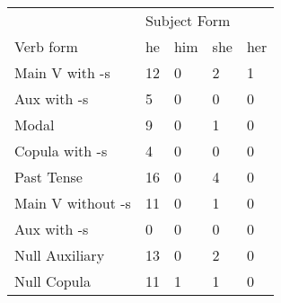 \begin{table}[]
\begin{minipage}{0.5\textwidth}
\end{minipage}
\begin{minipage}{0.5\textwidth}
    \centering
    \begin{tabular}{@{}lllll@{}}
        \toprule
            &\multicolumn{4}{l}{Subject Form}\\
            \cline{2-5}
        Verb form & he & him & she & her \\
        \midrule
        Main V with -s & 12 & 0 & 2 & 1 \\
        Aux with -s & 5 & 0 & 0 & 0 \\
        Modal & 9 & 0 & 1 & 0 \\
        Copula with -s & 4 & 0 & 0 & 0 \\
        Past Tense & 16 & 0 & 4 & 0 \\
        \hline
        Main V without -s & 11 & 0 & 1 & 0 \\
        Aux with -s & 0 & 0 & 0 & 0 \\
        Null Auxiliary & 13 & 0 & 2 & 0 \\
        Null Copula & 11 & 1 & 1 & 0 \\
        \bottomrule
    \end{tabular}
    \end{minipage}
\end{table}

